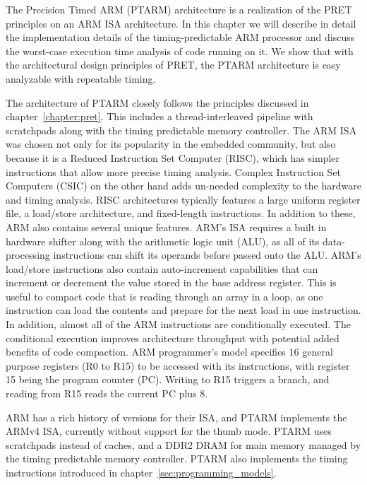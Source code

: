 The Precision Timed ARM (PTARM) architecture is a realization of the PRET principles on an ARM ISA architecture. 
In this chapter we will describe in detail the implementation details of the timing-predictable ARM processor and discuss the worst-case execution time analysis of code running on it.
We show that with the architectural design principles of PRET, the PTARM architecture is easy analyzable with repeatable timing.
  
The architecture of PTARM closely follows the principles discussed in chapter~\ref{chapter:pret}.
This includes a thread-interleaved pipeline with scratchpads along with the timing predictable memory controller.
The ARM ISA was chosen not only for its popularity in the embedded community, but also because it is a Reduced Instruction Set Computer (RISC), which has simpler instructions that allow more precise timing analysis. 
Complex Instruction Set Computers (CSIC) on the other hand adds un-needed complexity to the hardware and timing analysis.
RISC architectures typically features a large uniform register file, a load/store architecture, and fixed-length instructions.
In addition to these, ARM also contains several unique features.
ARM's ISA requires a built in hardware shifter along with the arithmetic logic unit (ALU), as all of its data-processing instructions can shift its operands before passed onto the ALU. 
ARM's load/store instructions also contain auto-increment capabilities that can increment or decrement the value stored in the base address register. 
This is useful to compact code that is reading through an array in a loop, as one instruction can load the contents and prepare for the next load in one instruction.
In addition, almost all of the ARM instructions are conditionally executed.
The conditional execution improves architecture throughput with potential added benefits of code compaction.     
ARM programmer's model specifies 16 general purpose registers (R0 to R15) to be accessed with its instructions, with register 15 being the program counter (PC). 
Writing to R15 triggers a branch, and reading from R15 reads the current PC plus 8.

ARM has a rich history of versions for their ISA, and PTARM implements the ARMv4 ISA, currently without support for the thumb mode.
PTARM uses scratchpads instead of caches, and a DDR2 DRAM for main memory managed by the timing predictable memory controller.
PTARM also implements the timing instructions introduced in chapter~\ref{sec:programming_models}.   

